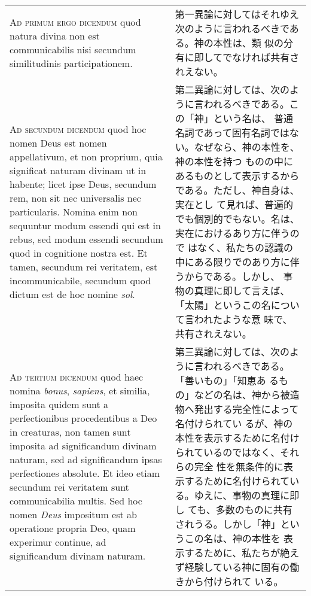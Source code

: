 \documentclass[10pt]{jsarticle}
\begin{document}
\begin{longtable}{p{21em}p{21em}}
\\

{\scshape Ad primum ergo dicendum} quod natura divina non est
communicabilis nisi secundum similitudinis participationem.

&

第一異論に対してはそれゆえ次のように言われるべきである。神の本性は、類
似の分有に即してでなければ共有されえない。
\\

{\scshape Ad secundum dicendum} quod hoc nomen Deus est nomen
appellativum, et non proprium, quia significat naturam divinam ut in
habente; licet ipse Deus, secundum rem, non sit nec universalis nec
particularis. Nomina enim non sequuntur modum essendi qui est in
rebus, sed modum essendi secundum quod in cognitione nostra est. Et
tamen, secundum rei veritatem, est incommunicabile, secundum quod
dictum est de hoc nomine {\itshape sol}.

&

第二異論に対しては、次のように言われるべきである。この「神」という名は、
普通名詞であって固有名詞ではない。なぜなら、神の本性を、神の本性を持つ
ものの中にあるものとして表示するからである。ただし、神自身は、実在とし
て見れば、普遍的でも個別的でもない。名は、実在におけるあり方に伴うので
はなく、私たちの認識の中にある限りでのあり方に伴うからである。しかし、
事物の真理に即して言えば、「太陽」というこの名について言われたような意
味で、共有されえない。

\\

{\scshape Ad tertium dicendum} quod haec nomina {\itshape bonus},
{\itshape sapiens}, et similia, imposita quidem sunt a perfectionibus
procedentibus a Deo in creaturas, non tamen sunt imposita ad
significandum divinam naturam, sed ad significandum ipsas perfectiones
absolute. Et ideo etiam secundum rei veritatem sunt communicabilia
multis. Sed hoc nomen {\itshape Deus} impositum est ab operatione
propria Deo, quam experimur continue, ad significandum divinam
naturam.

&

第三異論に対しては、次のように言われるべきである。「善いもの」「知恵あ
るもの」などの名は、神から被造物へ発出する完全性によって名付けられてい
るが、神の本性を表示するために名付けられているのではなく、それらの完全
性を無条件的に表示するために名付けられている。ゆえに、事物の真理に即し
ても、多数のものに共有されうる。しかし「神」というこの名は、神の本性を
表示するために、私たちが絶えず経験している神に固有の働きから付けられて
いる。

\end{longtable}
\newpage
{}
\end{document}
